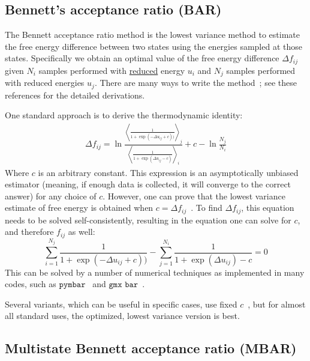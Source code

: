 \documentclass[9pt,review]{livecoms}
\begin{document}
\subsection{Bennett's acceptance ratio (BAR)}

The Bennett acceptance ratio method is the lowest variance method to estimate the free energy difference between two states using the energies sampled at those states. Specifically we
obtain an optimal value of the free energy difference $\Delta f_{ij}$ given $N_i$ samples performed with \hyperlink{ref:reduced} {reduced} energy $u_i$ and $N_j$ samples performed with reduced energies $u_j$. There are many ways to write
the method~\cite{bennett:jcp:1976:fe-estimate,shirts_comparison_2005,fenwick-escobedo:jcp:2003:replica-exchange-expanded-ensembles}; see these references for the detailed derivations.

One standard approach is to derive the thermodynamic identity:
\begin{eqnarray}
\Delta f_{ij} = \ln \frac{\left\langle \frac{1}{1 + \exp(-\Delta u_{ij}+c))}\right\rangle_j}{\left \langle \frac{1}{1 + \exp(\Delta u_{ij}-c)}\right\rangle_i} + c-\ln\frac{N_j}{N_i}
\end{eqnarray}
Where $c$ is an arbitrary constant. This expression is an asymptotically unbiased estimator (meaning, if enough data is collected, it will converge to the correct answer) for any choice
of $c$. However, one can prove that the lowest variance estimate of free energy is obtained when $c=\Delta f_{ij}$~\cite{bennett:jcp:1976:fe-estimate}. To find $\Delta f_{ij}$, this equation needs to be solved self-consistently, resulting in the equation one can solve for $c$, and therefore $f_{ij}$ as well:
\begin{equation}
\sum_{i=1}^{N_j} \frac{1}{1 + \exp(-\Delta u_{ij}+c))} - \sum_{j=1}^{N_i} \frac{1}{1 + \exp(\Delta u_{ij})-c} = 0
\end{equation}
This can be solved by a number of numerical techniques as implemented in many codes, such as $\texttt{pymbar}$~\cite{shirts-chodera:jcp:2008:mbar} and $\texttt{gmx bar}$~\cite{lindahl_2021}.

Several variants, which can be useful in specific cases, use fixed $c$~\cite{fenwick-escobedo:jcp:2003:replica-exchange-expanded-ensembles,Paliwal_comparison_2011}, but for almost all standard uses, the optimized, lowest variance version is best.


\subsection{Multistate Bennett acceptance ratio (MBAR)}
\end{document}

